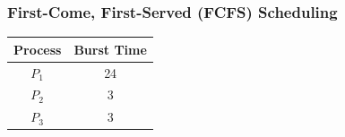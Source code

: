 \subsubsection{First-Come, First-Served (FCFS) Scheduling}

\begin{table}[!htb]
    \centering
    \begin{tabular}[c]{cc}\toprule
        Process & Burst Time \\ \midrule
        $P_1$ & 24 \\
        $P_2$ & 3 \\
        $P_3$ & 3 
        \\ \bottomrule
    \end{tabular}
\end{table}

